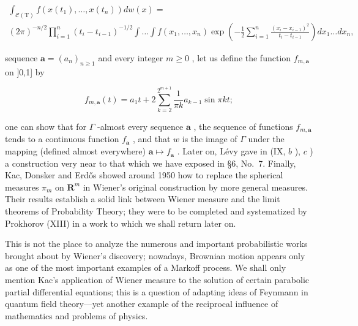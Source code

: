 \[
\begin{array}{l} \int_ {\mathcal {C} (\mathrm{T})} f (x (t _ {1}), \dots , x (t _ {n})) d w (x) = \\ (2 \pi) ^ {- n / 2} \prod_ {i = 1} ^ {n} (t _ {i} - t _ {i - 1}) ^ {- 1 / 2} \int \dots \int f (x _ {1}, \dots , x _ {n}) \exp \left(- \frac {1}{2} \sum_ {i = 1} ^ {n} \frac {(x _ {i} - x _ {i - 1}) ^ {2}}{t _ {i} - t _ {i - 1}}\right) d x _ {1} \dots d x _ {n}, \end{array}
\]

sequence \(\mathbf{a} = (a_n)_{n\geqslant 1}\) and every integer \(m\geqslant 0\) , let us define the function \(f_{m,\mathbf{a}}\) on ]0,1] by

\[
f _ {m, \mathbf {a}} (t) = a _ {1} t + 2 \sum_ {k = 2} ^ {2 ^ {m + 1}} \frac {1}{\pi k} a _ {k - 1} \sin \pi k t;
\]

one can show that for \(\Gamma\) -almost every sequence \(\mathbf{a}\) , the sequence of functions \(f_{m,\mathbf{a}}\) tends to a continuous function \(f_{\mathbf{a}}\) , and that \(w\) is the image of \(\Gamma\) under the mapping (defined almost everywhere) \(\mathbf{a} \mapsto f_{\mathbf{a}}\) . Later on, Lévy gave in (IX, \(b\) ), \(c\) ) a construction very near to that which we have exposed in §6, No.~7. Finally, Kac, Donsker and Erdős showed around 1950 how to replace the spherical measures \(\pi_m\) on \(\mathbf{R}^m\) in Wiener's original construction by more general measures. Their results establish a solid link between Wiener measure and the limit theorems of Probability Theory; they were to be completed and systematized by Prokhorov (XIII) in a work to which we shall return later on.

This is not the place to analyze the numerous and important probabilistic works brought about by Wiener's discovery; nowadays, Brownian motion appears only as one of the most important examples of a Markoff process. We shall only mention Kac's application of Wiener measure to the solution of certain parabolic partial differential equations; this is a question of adapting ideas of Feynmann in quantum field theory---yet another example of the reciprocal influence of mathematics and problems of physics.


